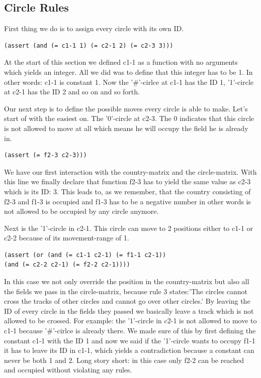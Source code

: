 \documentclass[a4paper,10pt]{paper}
\begin{document}
\subsection{Circle Rules}
First thing we do is to assign every circle with its own ID.
\begin{lstlisting}
(assert (and (= c1-1 1) (= c2-1 2) (= c2-3 3)))
\end{lstlisting}
At the start of this section we defined c1-1 as a function with no arguments which yields an integer. All we did was to define that this integer has to be 1. In other words: c1-1 is constant 1.
Now the '\#'-cirlce at c1-1 has the ID 1, '1'-circle at c2-1 has the ID 2 and so on and so forth.

Our next step is to define the possible moves every circle is able to make. Let's start of with the easiest on. The '0'-circle at c2-3. The 0 indicates that this circle is not allowed to move at all which means he will occupy the field he is already in.
\begin{lstlisting}
(assert (= f2-3 c2-3)))
\end{lstlisting}
We have our first interaction with the country-matrix and the circle-matrix. With this line we finally declare that function f2-3 has to yield the same value as c2-3 which is its ID: 3. This leads to, as we remember, that the country consisting of f2-3 and f1-3 is occupied and f1-3 has to be a negative number in other words is not allowed to be occupied by any circle anymore.

Next is the '1'-circle in c2-1. This circle can move to 2 positions either to c1-1 or c2-2 because of its movement-range of 1.
\begin{lstlisting}
(assert (or (and (= c1-1 c2-1) (= f1-1 c2-1)) 
(and (= c2-2 c2-1) (= f2-2 c2-1))))
\end{lstlisting}
In this case we not only override the position in the country-matrix but also all the fields we pass in the circle-matrix, because rule 3 states:'The circles cannot cross the tracks of other circles and cannot go over other circles.' By leaving the ID of every circle in the fields they passed we basically leave a track which is not allowed to be crossed.
For example: the '1'-circle in c2-1 is not allowed to move to c1-1 because '\#'-cirlce is already there. We made sure of this by first defining the constant c1-1 with the ID 1 and now we said if the '1'-circle wants to occupy f1-1 it has to leave its ID in c1-1, which yields a contradiction because a constant can never be both 1 and 2.
Long story short: in this case only f2-2 can be reached and occupied without violating any rules.
\end{document}
